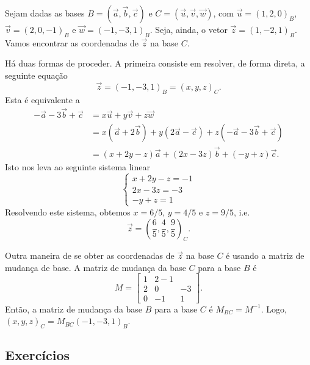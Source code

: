 \begin{ex}
  Sejam dadas as bases $B = (\vec{a},\vec{b},\vec{c})$ e $C = (\vec{u},\vec{v},\vec{w})$, com $\vec{u}=(1,2,0)_B$, $\vec{v}=(2,0,-1)_B$ e $\vec{w}=(-1,-3,1)_B$. Seja, ainda, o vetor $\vec{z} = (1,-2,1)_B$. Vamos encontrar as coordenadas de $\vec{z}$ na base $C$.

  Há duas formas de proceder. A primeira consiste em resolver, de forma direta, a seguinte equação
  \begin{equation}
    \vec{z} = (-1,-3,1)_B = (x,y,z)_C.
  \end{equation}
  Esta é equivalente a
  \begin{align}
    -\vec{a}-3\vec{b}+\vec{c} &= x\vec{u}+y\vec{v}+z\vec{w} \\
                              &= x(\vec{a}+2\vec{b})+y(2\vec{a}-\vec{c})+z(-\vec{a}-3\vec{b}+\vec{c})\\
                              &= (x+2y-z)\vec{a}+(2x-3z)\vec{b}+(-y+z)\vec{c}.
  \end{align}
  Isto nos leva ao seguinte sistema linear
  \begin{equation}
    \left\{
      \begin{array}{l}
        x+2y-z=-1\\
        2x-3z=-3\\
        -y+z=1
      \end{array}
\right.
\end{equation}
Resolvendo este sistema, obtemos $x=6/5$, $y=4/5$ e $z=9/5$, i.e.
\begin{equation}
  \vec{z} = \left(\frac{6}{5},\frac{4}{5},\frac{9}{5}\right)_C.
\end{equation}

Outra maneira de se obter as coordenadas de $\vec{z}$ na base $C$ é usando a matriz de mudança de base. A matriz de mudança da base $C$ para a base $B$ é
\begin{equation}
  M =
  \begin{bmatrix}
    1 & 2 -1\\
    2 & 0 & -3\\
    0 & -1 & 1
  \end{bmatrix}.
\end{equation}
  Então, a matriz de mudança da base $B$ para a base $C$ é $M_{BC} = M^{-1}$. Logo, $(x,y,z)_C = M_{BC}(-1,-3,1)_B$.
\end{ex}

\subsection*{Exercícios}

